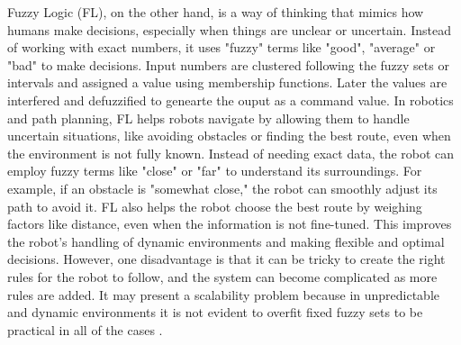 Fuzzy Logic (FL), on the other hand, is a way of thinking that mimics how humans make decisions, especially when things are unclear 
or uncertain. Instead of working with exact numbers, it uses "fuzzy" terms like "good", "average" or "bad" to make 
decisions. Input numbers are clustered following the fuzzy sets or intervals and assigned a value using membership 
functions. Later the values are interfered and defuzzified to genearte the ouput as a command value. 
In robotics and path planning, FL helps robots navigate by allowing them to handle uncertain situations, 
like avoiding obstacles or finding the best route, even when the environment is not fully known. Instead of needing 
exact data, the robot can employ fuzzy terms like "close" or "far" to understand its surroundings. For example, if an 
obstacle is "somewhat close," the robot can smoothly adjust its path to avoid it. FL also helps the robot choose the best 
route by weighing factors like distance, even when the information is not fine-tuned. This improves the 
robot's handling of dynamic environments and making flexible and optimal decisions.
However, one 
disadvantage is that it can be tricky to create the right rules for the robot to follow, and the system can become 
complicated as more rules are added. It may present a scalability problem because in unpredictable and dynamic environments
it is not evident to overfit fixed fuzzy sets to be practical in all of the cases \cite{R12}.

